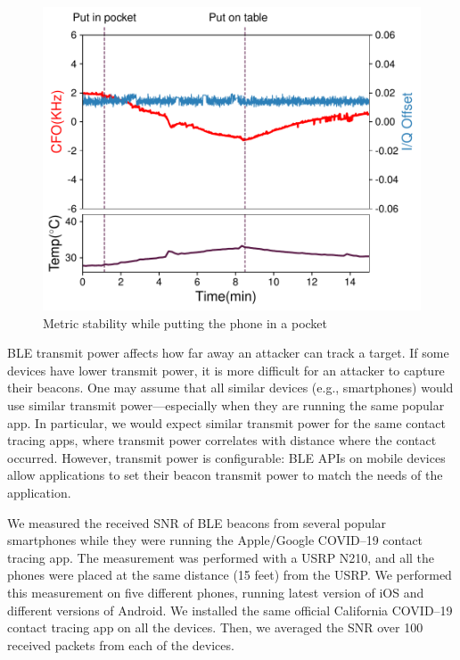     \begin{figure}
        \centering
        \includegraphics[width = \linewidth]{bletracking/plots/idle_temp_cfoiq.pdf} 
        \caption{Metric stability while putting the phone in a pocket}
        \label{fig:idle_cfo}
    \end{figure}

BLE transmit power affects how far away an attacker can track a target.  If
some devices have lower transmit power, it is more difficult for an
attacker to capture their beacons.  One may assume that all similar devices
(e.g., smartphones) would use similar transmit power---especially when they are running the same popular
app. In particular, we would expect similar transmit power for
the same contact tracing apps, where transmit power correlates with distance where the
contact occurred.  However, transmit power is configurable: BLE
APIs on mobile devices allow applications to set their beacon transmit power
to match the needs of the application.

We measured the received SNR of BLE beacons from several popular smartphones while they were
running the Apple/Google COVID--19 contact tracing app.  The measurement was
performed with a USRP N210, and all the phones were placed at the same distance (15 feet) from the
USRP. We performed this measurement on five different phones, running latest
version of iOS and different versions of Android. We installed the same
official California COVID--19 contact tracing app on all the devices. Then,
we averaged the SNR over 100 received packets
from each of the devices.

